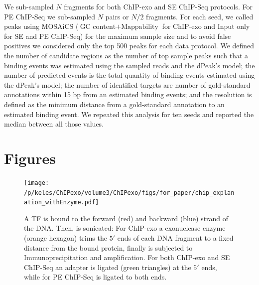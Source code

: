 \documentclass{bmcart}\usepackage[]{graphicx}\usepackage[]{color}
\begin{document}
We sub-sampled $N$ fragments for both ChIP-exo and SE ChIP-Seq
protocols. For PE ChIP-Seq we sub-sampled $N$ pairs or $N/2$
fragments. For each seed, we called peaks using MOSAiCS \cite{mosaics}
($\mbox{GC content} + \mbox{Mappability}$ for ChIP-exo and
$\mbox{Input only}$ for SE and PE ChIP-Seq) for the maximum sample
size and to avoid false positives we considered only the top 500 peaks
for each data protocol. We defined the number of candidate regions as
the number of top sample peaks such that a binding events was
estimated using the sampled reads and the dPeak's model; the number of
predicted events is the total quantity of binding events estimated
using the dPeak's model; the number of identified targets are number
of gold-standard annotations within 15 bp from an estimated
binding events; and the resolution is defined as the minimum distance
from a gold-standard annotation to an estimated binding event. We
repeated this analysis for ten seeds and reported the median between
all those values.



\nocite{exo_gb}
\nocite{maplot1}
\nocite{maplot2}
\nocite{chipbeyond}
\nocite{meme}



\newpage

\section{Figures}

\begin{figure}[h!]
  \centering
  \texttt{[image: /p/keles/ChIPexo/volume3/ChIPexo/figs/for\_paper/chip\_explanation\_withEnzyme.pdf]}
  \caption{A TF is bound to the forward (red) and backward (blue)
    strand of the DNA. Then, is sonicated: For ChIP-exo a exonuclease
    enzyme (orange hexagon) trims the $5\prime$ ends of each DNA
    fragment to a fixed distance from the bound protein, finally is
    subjected to Immunoprecipitation and amplification. For both
    ChIP-exo and SE ChIP-Seq an adapter is ligated (green triangles)
    at the $5\prime$ ends, while for PE ChIP-Seq is ligated to both
    ends.}
  \label{fig:chip_diagram}
\end{figure}
\newpage
\end{document}
